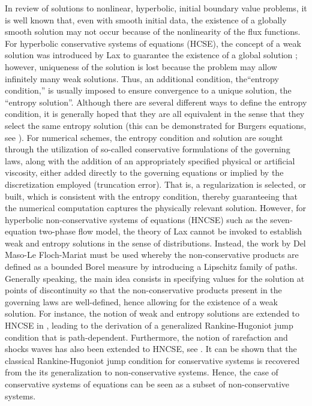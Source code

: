 In review of solutions to nonlinear, hyperbolic, initial boundary value problems, it is well known that, even with smooth initial data, 
the existence of a globally smooth solution may not occur because of the nonlinearity of the flux functions. For hyperbolic conservative systems 
of equations (HCSE), the concept of a weak solution was introduced by Lax to guarantee the existence of a global solution \cite{Lax}; 
however, uniqueness of the solution is lost because the problem may allow infinitely many weak solutions. Thus, an additional condition, 
the``entropy condition,'' is usually imposed to ensure convergence to a unique solution, the ``entropy solution''.
Although there are several different ways to define the entropy condition, it is generally hoped that they are all equivalent in the sense 
that they select the same entropy solution (this can be demonstrated for Burgers equations, see \cite{Evans1998,Lellis_minimalentropy}).
For numerical schemes, the entropy condition and solution are sought through the utilization of so-called conservative formulations of the 
governing laws, along with the addition of an appropriately specified physical or artificial viscosity, either added directly to the governing 
equations or implied by the discretization employed (truncation error). That is, a regularization is selected, or built, which is consistent with the 
entropy condition, thereby guaranteeing that the numerical computation captures the physically relevant solution. However, for hyperbolic 
non-conservative systems of equations (HNCSE) such as the seven-equation two-phase flow model, the theory of Lax cannot be invoked to establish 
weak and entropy solutions in the sense of distributions. Instead, the work by Del Maso-Le Floch-Mariat \cite{dlm} must be used
whereby the non-conservative products are defined as a bounded Borel measure by introducing a Lipschitz family of paths.
Generally speaking, the main idea consists in specifying values for the solution at points of discontinuity so that the non-conservative products
present in the governing laws are well-defined, hence allowing for the existence of a weak solution. For instance, the notion of weak and entropy solutions 
are extended to HNCSE in \cite{lefloch_1988,lefloch_1989}, leading to the derivation of a generalized Rankine-Hugoniot jump condition
that is path-dependent. Furthermore, the notion of rarefaction and shocks waves has also been extended to HNCSE,
see \cite{lefloch_liu_1993}. It can be shown that the classical Rankine-Hugoniot jump condition for conservative systems \cite{Lax} is recovered from the 
its generalization to non-conservative systems. Hence, the case of conservative systems of equations can be seen as 
a subset of non-conservative systems. 

